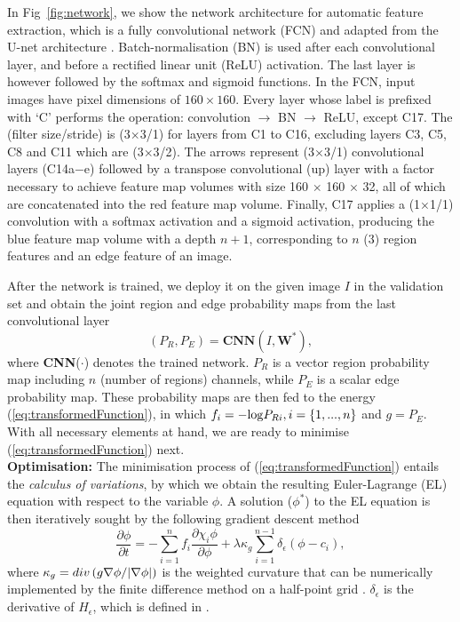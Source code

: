\documentclass[runningheads,a4paper]{llncs}
\begin{document}
In Fig~\ref{fig:network}, we show the network architecture for automatic feature extraction, which is a fully convolutional network (FCN) and adapted from the U-net architecture \cite{simonyan2014very}. Batch-normalisation (BN) is used after each convolutional layer, and before a rectified linear unit (ReLU) activation. The last layer is however followed by the softmax and sigmoid functions. In the FCN, input images have pixel dimensions of $160 \times 160$. Every layer whose label is prefixed with `C' performs the operation: convolution $\to$ BN $\to$ ReLU, except C17. The (filter size/stride) is (3$\times$3/1) for layers from C1 to C16, excluding layers C3, C5, C8 and C11 which are (3$\times$3/2). The arrows represent (3$\times$3/1) convolutional layers (C14a$-$e) followed by a transpose convolutional (up) layer with a factor necessary to achieve feature map volumes with size 160 $\times$ 160 $\times$ 32, all of which are concatenated into the red feature map volume. Finally, C17 applies a (1$\times$1/1) convolution with a softmax activation and a sigmoid activation, producing the blue feature map volume with a depth $n+1$, corresponding to $n$ (3) region features and an edge feature of an image.

After the network is trained, we deploy it on the given image $I$ in the validation set and obtain the joint region and edge probability maps from the last convolutional layer
\begin{equation}
(P_R,P_E)=\textbf{CNN}(I,\textbf{W}^*),
\end{equation}
where \textbf{CNN}($\cdot$) denotes the trained network. $P_R$ is a vector region probability map including $n$ (number of regions) channels, while $P_E$ is a scalar edge probability map. These probability maps are then fed to the energy (\ref{eq:transformedFunction}), in which $f_i = -{\rm{log}}P_{Ri}, i=\{1,...,n\}$ and $g=P_E$. With all necessary elements at hand, we are ready to minimise (\ref{eq:transformedFunction}) next. \\

\noindent\textbf{Optimisation:} The minimisation process of (\ref{eq:transformedFunction}) entails the \textit{calculus of variations}, by which we obtain the resulting Euler-Lagrange (EL) equation with respect to the variable $\phi$. A solution ($\phi^*$) to the EL equation is then iteratively sought by the following gradient descent method
\begin{equation} \label{eq:GD}
\frac{{\partial \phi }}{{\partial t}} =  - \sum\limits_{i = 1}^n {{f_i}\frac{{\partial {\chi _i}\phi }}{{\partial \phi }}}  + \lambda {\kappa _g}\sum\limits_{i = 1}^{n - 1} {\delta_\epsilon \left( {\phi  - {c_i}} \right)},
\end{equation}
where ${\kappa _g} = div\left( {g{{\nabla \phi } \mathord{\left/{\vphantom {{\nabla \phi } {\left| {\nabla \phi } \right|}}} \right.\kern-\nulldelimiterspace} {\left| {\nabla \phi } \right|}}} \right)$ is the weighted curvature that can be numerically implemented by the finite difference method on a half-point grid \cite{duan2015surface}. $\delta_\epsilon$ is the derivative of $H_\epsilon$, which is defined in \cite{chung2009image}. 
\end{document}
